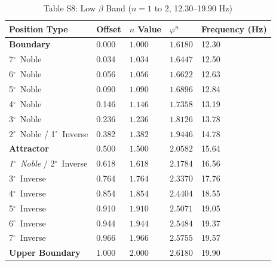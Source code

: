 \documentclass[11pt,a4paper]{article}
\newcommand{\degree}{$^\circ$}  %
\begin{document}
\begin{table}[H]
\centering
\caption*{Table S8: Low $\beta$ Band ($n = 1$ to $2$, 12.30--19.90 Hz)}
\begin{tabular}{@{}lllll@{}}
\toprule
Position Type & Offset & $n$ Value & $\varphi^n$ & Frequency (Hz) \\
\midrule
\textbf{Boundary} & 0.000 & $1.000$ & $1.6180$ & 12.30 \\
7\degree\ Noble & 0.034 & $1.034$ & $1.6447$ & 12.50 \\
6\degree\ Noble & 0.056 & $1.056$ & $1.6622$ & 12.63 \\
5\degree\ Noble & 0.090 & $1.090$ & $1.6896$ & 12.84 \\
4\degree\ Noble & 0.146 & $1.146$ & $1.7358$ & 13.19 \\
3\degree\ Noble & 0.236 & $1.236$ & $1.8126$ & 13.78 \\
2\degree\ Noble / 1\degree\ Inverse & 0.382 & $1.382$ & $1.9446$ & 14.78 \\
\textbf{Attractor} & 0.500 & $1.500$ & $2.0582$ & 15.64 \\
\textit{1\degree\ Noble} / 2\degree\ Inverse & 0.618 & $1.618$ & $2.1784$ & 16.56 \\
3\degree\ Inverse & 0.764 & $1.764$ & $2.3370$ & 17.76 \\
4\degree\ Inverse & 0.854 & $1.854$ & $2.4404$ & 18.55 \\
5\degree\ Inverse & 0.910 & $1.910$ & $2.5071$ & 19.05 \\
6\degree\ Inverse & 0.944 & $1.944$ & $2.5484$ & 19.37 \\
7\degree\ Inverse & 0.966 & $1.966$ & $2.5755$ & 19.57 \\
\textbf{Upper Boundary} & 1.000 & $2.000$ & $2.6180$ & 19.90 \\
\bottomrule
\end{tabular}
\end{table}
\end{document}
